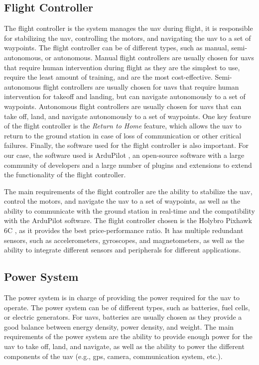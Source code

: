 \subsection{Flight Controller}

The flight controller is the system manages the \gls{uav} during flight, it is responsible for stabilizing the \gls{uav}, controlling the motors, and navigating the \gls{uav} to a set of waypoints. The flight controller can be of different types, such as manual, semi-autonomous, or autonomous. Manual flight controllers are usually chosen for \glspl{uav} that require human intervention during flight as they are the simplest to use, require the least amount of training, and are the most cost-effective. Semi-autonomous flight controllers are usually chosen for \glspl{uav} that require human intervention for takeoff and landing, but can navigate autonomously to a set of waypoints. Autonomous flight controllers are usually chosen for \glspl{uav} that can take off, land, and navigate autonomously to a set of waypoints. One key feature of the flight controller is the \textit{Return to Home} feature, which allows the \gls{uav} to return to the ground station in case of loss of communication or other critical failures. Finally, the software used for the flight controller is also important. For our case, the software used is ArduPilot \autocite{ardupilotArduPilot}, an open-source software with a large community of developers and a large number of plugins and extensions to extend the functionality of the flight controller.

The main requirements of the flight controller are the ability to stabilize the \gls{uav}, control the motors, and navigate the \gls{uav} to a set of waypoints, as well as the ability to communicate with the ground station in real-time and the compatibility with the ArduPilot software. The flight controller chosen is the Holybro Pixhawk 6C \autocite{rcinnovationsPixhawkCarcasa}, as it provides the best price-performance ratio. It has multiple redundant sensors, such as accelerometers, gyroscopes, and magnetometers, as well as the ability to integrate different sensors and peripherals for different applications.

\subsection{Power System}\label{subsec:design_power_system}

The power system is in charge of providing the power required for the \gls{uav} to operate. The power system can be of different types, such as batteries, fuel cells, or electric generators. For \glspl{uav}, batteries are usually chosen as they provide a good balance between energy density, power density, and weight. The main requirements of the power system are the ability to provide enough power for the \gls{uav} to take off, land, and navigate, as well as the ability to power the different components of the \gls{uav} (e.g., \gls{gps}, camera, communication system, etc.).

